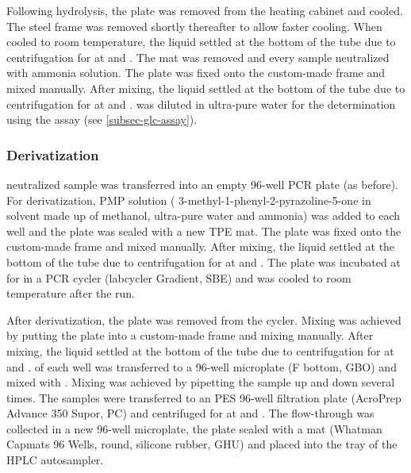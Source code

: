Following hydrolysis, the plate was removed from the heating cabinet and cooled. The steel frame was removed shortly thereafter to allow faster cooling. When cooled to room temperature, the liquid settled at the bottom of the tube due to centrifugation for  at  and . The mat was removed and every sample neutralized with  ammonia solution. The plate was fixed onto the custom-made frame and mixed manually. After mixing, the liquid settled at the bottom of the tube due to centrifugation for  at  and .  was diluted in  ultra-pure water for the \glc{} determination using the \glc{} assay (see \vref{subsec-glc-assay}). %

\subsubsection{Derivatization\label{pmp-deriv}}
 neutralized sample was transferred into an empty 96-well PCR plate (as before). For derivatization,  PMP solution ( 3-methyl-1-phenyl-2-pyrazoline-5-one in  solvent made up of  methanol,  ultra-pure water and   ammonia) was added to each well and the plate was sealed with a new TPE mat. The plate was fixed onto the custom-made frame and mixed manually. After mixing, the liquid settled at the bottom of the tube due to centrifugation for  at  and . The plate was incubated at  for  in a PCR cycler (labcycler Gradient, SBE) and was cooled to room temperature after the run.

After derivatization, the plate was removed from the cycler. Mixing was achieved by putting the plate into a custom-made frame and mixing manually. After mixing, the liquid settled at the bottom of the tube due to centrifugation for  at  and .  of each well was transferred to a 96-well microplate (F bottom, GBO) and mixed with   \acet{}. Mixing was achieved by pipetting the sample up and down several times. The samples were transferred to an  PES 96-well filtration plate (AcroPrep Advance 350  Supor, PC) and centrifuged for  at  and . The flow-through was collected in a new 96-well microplate, the plate sealed with a mat (Whatman Capmats 96 Wells, round, silicone rubber, GHU) and placed into the tray of the HPLC autosampler.

